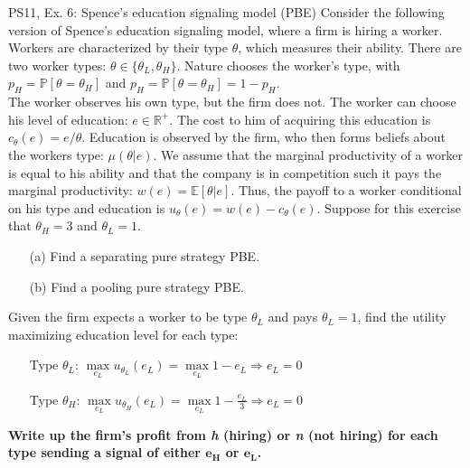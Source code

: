 \begin{frame}{PS11, Ex. 6: Spence’s education signaling model (PBE)}
    Consider the following version of Spence’s education signaling model, where a firm is hiring a worker. Workers are characterized by their type $\theta$, which measures their ability. There are two worker types: $\theta\in\{\theta_L,\theta_H\}$. Nature chooses the worker’s type, with $p_H=\mathbb{P}[\theta=\theta_H]$ and $p_H=\mathbb{P}[\theta=\theta_H]=1-p_H$.\\\vspace{2pt}
    The worker observes his own type, but the firm does not. The worker can choose his level of education: $e\in\mathbb{R}^{+}$. The cost to him of acquiring this education is $c_\theta(e)=e/\theta$. Education is observed by the firm, who then forms beliefs about the workers type: $\mu(\theta|e)$. We assume that the marginal productivity of a worker is equal to his ability and that the company is in competition such it pays the marginal productivity: $w(e)=\mathbb{E}[\theta|e]$. Thus, the payoff to a worker conditional on his type and education is $u_\theta(e)=w(e)-c_\theta(e)$. Suppose for this exercise that $\theta_H=3$ and $\theta_L=1$.\vspace{-8pt}
    \begin{multicols}{2}
      \begin{itemize}
        \item[(a)] Find a separating pure strategy PBE.
        \item[(b)] Find a pooling pure strategy PBE.
      \end{itemize}\vspace{-6pt}
      Given the firm expects a worker to be type $\theta_L$ and pays $\theta_L=1$, find the utility maximizing education level for each type:\vspace{-14pt}
      \begin{itemize}
        \item[Type $\theta_L$:] $\max\limits_{e_L}u_{\theta_L}(e_L)=\max\limits_{e_L}1-e_L\Rightarrow e_L=0$\\
        \item[Type $\theta_H$:] $\max\limits_{e_L}u_{\theta_H}(e_L)=\max\limits_{e_L}1-\frac{e_L}{3}\Rightarrow e_L=0$
      \end{itemize}\vspace{-4pt}
      \textbf{Write up the firm's profit from \textit{h} (hiring) or \textit{n} (not hiring) for each type sending a signal of either $\bm{e_H}$ or $\bm{e_L}$.}
      \vfill\null\columnbreak
      \vfill\null
    \end{multicols}
\end{frame}
